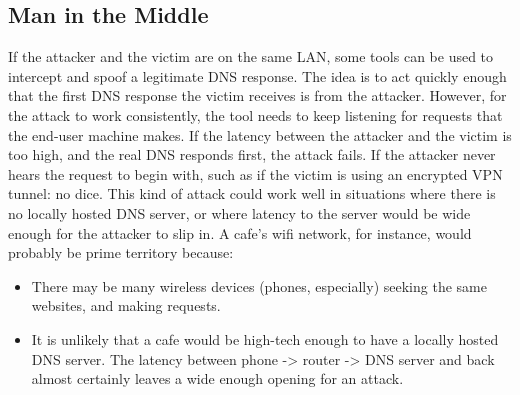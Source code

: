 \documentclass{article}
\begin{document}
\subsection{Man in the Middle}
	If the attacker and the victim are on the same LAN, some tools can be
	used to intercept and spoof a legitimate DNS response. The idea is to
	act quickly enough that the first DNS response the victim receives is
	from the attacker.  However, for the attack to work consistently, the
	tool needs to keep listening for requests that the end-user machine
	makes. If the latency between the attacker and the victim is too high,
	and the real DNS responds first, the attack fails. If the attacker
	never hears the request to begin with, such as if the victim is using
	an encrypted VPN tunnel: no dice. This kind of attack could work well
	in situations where there is no locally hosted DNS server, or where
	latency to the server would be wide enough for the attacker to slip in.
	A cafe's wifi network, for instance, would probably be prime territory
	because:
\begin{itemize}
	\item There may be many wireless devices (phones, especially) seeking
		the same websites, and making requests.
	\item It is unlikely that a cafe would be high-tech enough to have a
		locally hosted DNS server. The latency between phone ->
		router -> DNS server and back almost certainly leaves a wide
		enough opening for an attack.
\end{itemize}
\end{document}
